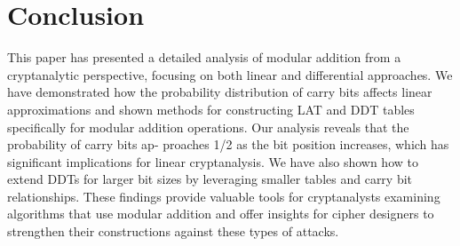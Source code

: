 \documentclass[runningheads]{llncs}
\begin{document}
\section{Conclusion}
This paper has presented a detailed analysis of modular
addition from a cryptanalytic perspective, focusing on both
linear and differential approaches. We have demonstrated
how the probability distribution of carry bits affects linear
approximations and shown methods for constructing LAT and
DDT tables specifically for modular addition operations.
Our analysis reveals that the probability of carry bits ap-
proaches 1/2 as the bit position increases, which has significant
implications for linear cryptanalysis. We have also shown how
to extend DDTs for larger bit sizes by leveraging smaller tables
and carry bit relationships.
These findings provide valuable tools for cryptanalysts
examining algorithms that use modular addition and offer
insights for cipher designers to strengthen their constructions
against these types of attacks.

\newpage

\printbibliography
\end{document}
